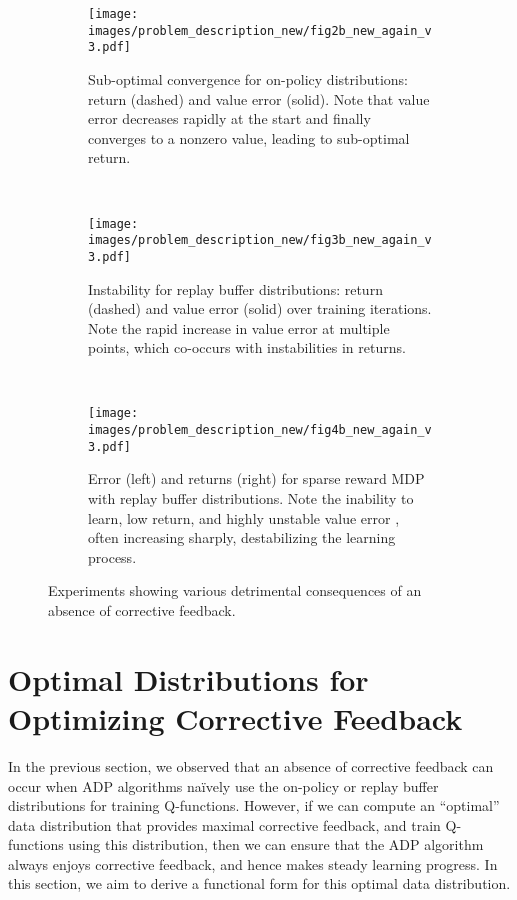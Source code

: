 \documentclass[jmlr]{article}
\begin{document}
\begin{figure}
    \begin{subfigure}[l]{0.3\linewidth}
    \centering
      \texttt{[image: images/problem\_description\_new/fig2b\_new\_again\_v3.pdf]}
      \caption{\footnotesize{Sub-optimal convergence for on-policy distributions: return (dashed) and value error (solid). Note that value error decreases rapidly at the start and finally converges to a nonzero value, leading to sub-optimal return.}}
      \label{fig:suboptimal_conv}
    \end{subfigure}
    ~
    \begin{subfigure}[l]{0.3\linewidth}
    \centering
    \texttt{[image: images/problem\_description\_new/fig3b\_new\_again\_v3.pdf]}
    \caption{\footnotesize{Instability for replay buffer distributions: return (dashed) and value error (solid) over training iterations. Note the rapid increase in value error at multiple points, which co-occurs with instabilities in returns.}}
    \label{fig:instability}
    \end{subfigure}
    ~
    \begin{subfigure}[l]{0.3\linewidth}
    \centering
      \texttt{[image: images/problem\_description\_new/fig4b\_new\_again\_v3.pdf]}
    \caption{\footnotesize{Error (left) and returns (right) for sparse reward MDP with replay buffer distributions. Note the inability to learn, low return, and highly unstable value error , often increasing sharply, destabilizing the learning process.}}
    \label{fig:sparse_reward}
    \end{subfigure} 
    \caption{\footnotesize{Experiments showing various detrimental consequences of an absence of corrective feedback.}}
\end{figure}














 \section{Optimal Distributions for Optimizing Corrective Feedback}
\label{sec:theoretical_derivation}
In the previous section, we observed that an absence of corrective feedback can occur when ADP algorithms na\"ively use the on-policy or replay buffer distributions for training Q-functions. However, if we can compute an ``optimal'' data distribution that provides maximal corrective feedback, and train Q-functions using this distribution, then we can ensure that the ADP algorithm always enjoys corrective feedback, and hence makes steady learning progress. In this section, we aim to derive a functional form for this optimal data distribution. 
\end{document}
